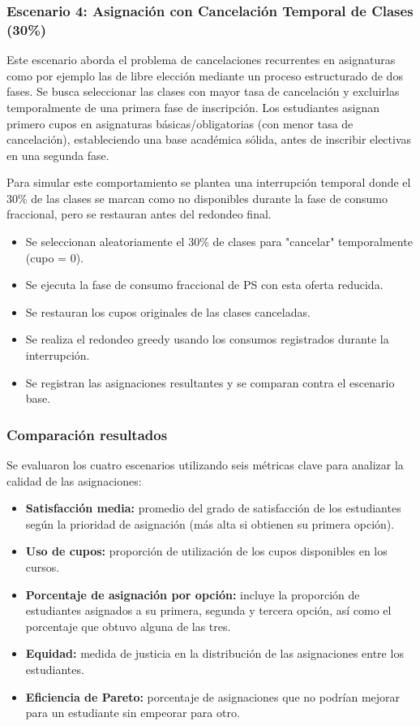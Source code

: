 \documentclass{article}
\begin{document}
\subsubsection{Escenario 4: Asignación con Cancelación Temporal de Clases (30\%)}

Este escenario aborda el problema de cancelaciones recurrentes en asignaturas como por ejemplo las de libre elección
 mediante un proceso estructurado de dos fases. Se busca seleccionar las clases con mayor tasa de cancelación
  y excluirlas temporalmente de una primera fase de inscripción. Los estudiantes asignan primero cupos en asignaturas básicas/obligatorias
   (con menor tasa de cancelación),
  estableciendo una base académica sólida, antes de inscribir electivas en una segunda fase. 

Para simular este comportamiento se plantea una interrupción temporal donde el 30\% de las clases se marcan 
como no disponibles durante la fase de consumo fraccional, 
pero se restauran antes del redondeo final. 

\begin{itemize}
\item Se seleccionan aleatoriamente el 30\% de clases para "cancelar" temporalmente (cupo = 0).
\item Se ejecuta la fase de consumo fraccional de PS con esta oferta reducida.
\item Se restauran los cupos originales de las clases canceladas.
\item Se realiza el redondeo greedy usando los consumos registrados durante la interrupción.
\item Se registran las asignaciones resultantes y se comparan contra el escenario base.
\end{itemize}

\subsubsection{Comparación resultados }

Se evaluaron los cuatro escenarios utilizando seis métricas clave para analizar la calidad de las asignaciones:

\begin{itemize}
  \item \textbf{Satisfacción media:} promedio del grado de satisfacción de los estudiantes según la prioridad de asignación (más alta si obtienen su primera opción).
  \item \textbf{Uso de cupos:} proporción de utilización de los cupos disponibles en los cursos.
  \item \textbf{Porcentaje de asignación por opción:} incluye la proporción de estudiantes asignados a su primera, segunda y tercera opción, así como el porcentaje que obtuvo alguna de las tres.
  \item \textbf{Equidad:} medida de justicia en la distribución de las asignaciones entre los estudiantes.
  \item \textbf{Eficiencia de Pareto:} porcentaje de asignaciones que no podrían mejorar para un estudiante sin empeorar para otro.
\end{itemize}
\end{document}
